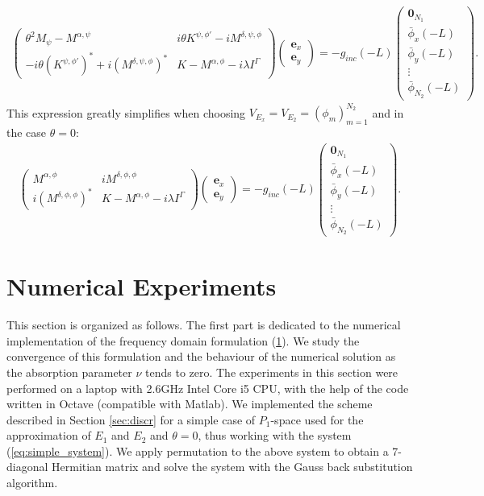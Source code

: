 \begin{align*}
\left(\begin{matrix}
\theta^2 M_{\psi}-M^{\alpha,\psi} & i\theta K^{\psi,\phi'}-i M^{\delta,\psi,\phi} \\
-i\theta (K^{\psi,\phi'})^{*}+i (M^{\delta,\psi,\phi})^{*} & K-M^{\alpha,\phi}-i\lambda I^{\Gamma}
\end{matrix}\right)
\left(
\begin{matrix}
\boldsymbol{e}_x\\
\boldsymbol{e}_y
\end{matrix}
\right)=-g_{inc}(-L)
\left(
\begin{matrix}
\boldsymbol{0}_{N_{1}}\\
\bar{\phi}_{x}(-L)\\
\bar{\phi}_{y}(-L)\\
\vdots\\
\bar{\phi}_{N_{2}}(-L)
\end{matrix}
\right).
\end{align*}
This expression greatly simplifies when choosing $V_{E_x}=V_{E_{2}}=\left(\phi_{m}\right)_{m=1}^{N_{2}}$ and in the case $\theta=0$:
\begin{align}
\label{eq:simple_system}
\left(\begin{matrix}
M^{\alpha,\phi} & i M^{\delta,\phi,\phi} \\
i (M^{\delta,\phi,\phi})^{*} & K-M^{\alpha,\phi}-i\lambda I^{\Gamma}
\end{matrix}\right)
\left(
\begin{matrix}
\boldsymbol{e}_x\\ 
\boldsymbol{e}_y
\end{matrix}
\right)=-g_{inc}(-L)
\left(
\begin{matrix}
\boldsymbol{0}_{N_{1}}\\
\bar{\phi}_{x}(-L)\\
\bar{\phi}_{y}(-L)\\
\vdots\\
\bar{\phi}_{N_{2}}(-L)
\end{matrix}
\right).
\end{align}





\section{Numerical Experiments}
This section is organized as follows. The first part is dedicated to the numerical implementation
of the frequency domain formulation (\ref{}). We study the convergence of this formulation and the behaviour 
of the numerical solution as the absorption parameter $\nu$ tends to zero. The experiments in this section were 
performed on a laptop with 2.6GHz Intel Core i5 CPU, with the help of the code written in Octave (compatible with Matlab). 
We implemented the scheme described in Section \ref{sec:discr} for a simple case of $P_{1}$-space used 
for the approximation of $E_{1}$ and $E_{2}$ and $\theta=0$, thus working with the system (\ref{eq:simple_system}). 
We apply permutation to the above system 
to obtain a 7-diagonal Hermitian matrix and solve the system with the Gauss back substitution algorithm. 

